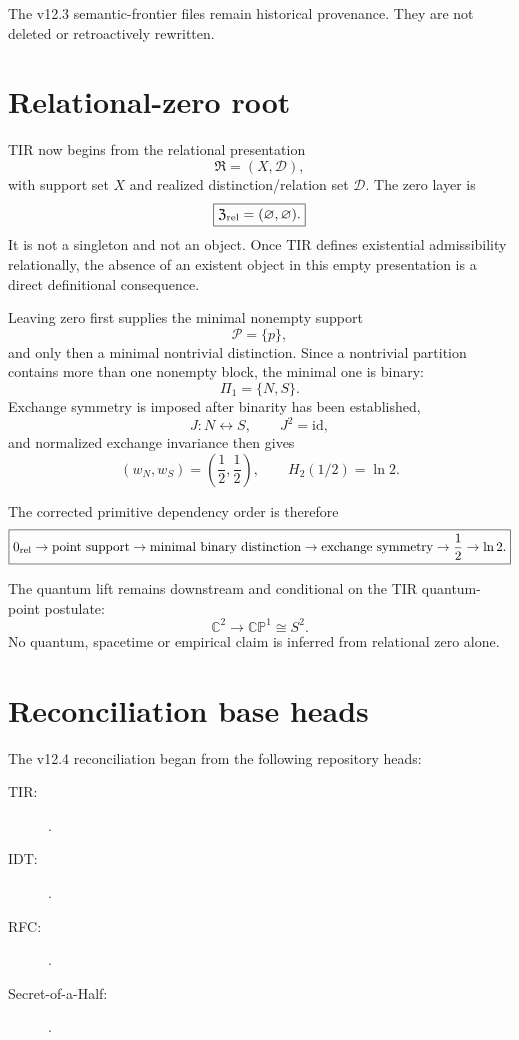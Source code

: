 \documentclass[11pt,a4paper,twoside]{book}
\theoremstyle{definition}
\begin{document}
The v12.3 semantic-frontier files remain historical provenance. They are not deleted or
retroactively rewritten.

\section{Relational-zero root}

TIR now begins from the relational presentation
\[
\mathfrak R=(X,\mathcal D),
\]
with support set $X$ and realized distinction/relation set $\mathcal D$. The zero layer is
\[
\boxed{
\mathfrak Z_{\rm rel}=(\varnothing,\varnothing).
}
\]
It is not a singleton and not an object. Once TIR defines existential admissibility
relationally, the absence of an existent object in this empty presentation is a direct
definitional consequence.

Leaving zero first supplies the minimal nonempty support
\[
\boxed{\mathcal P=\{p\}},
\]
and only then a minimal nontrivial distinction. Since a nontrivial partition contains
more than one nonempty block, the minimal one is binary:
\[
\boxed{\Pi_1=\{N,S\}}.
\]
Exchange symmetry is imposed after binarity has been established,
\[
J:N\leftrightarrow S,\qquad J^2=\mathrm{id},
\]
and normalized exchange invariance then gives
\[
\boxed{(w_N,w_S)=\left(\frac12,\frac12\right)},
\qquad
\boxed{H_2(1/2)=\ln2}.
\]

The corrected primitive dependency order is therefore
\[
\boxed{
0_{\rm rel}
\to
\text{point support}
\to
\text{minimal binary distinction}
\to
\text{exchange symmetry}
\to
\frac12
\to
\ln2.
}
\]

The quantum lift remains downstream and conditional on the TIR quantum-point postulate:
\[
\mathbb C^2\to\mathbb{CP}^1\cong S^2.
\]
No quantum, spacetime or empirical claim is inferred from relational zero alone.

\section{Reconciliation base heads}

The v12.4 reconciliation began from the following repository heads:

\begin{description}
\item[TIR:] .
\item[IDT:] .
\item[RFC:] .
\item[Secret-of-a-Half:] .
\end{description}
\end{document}
